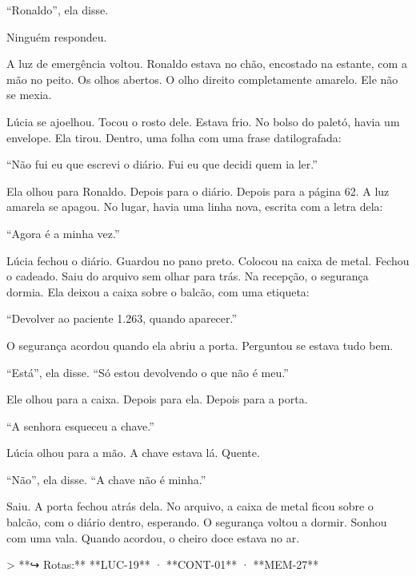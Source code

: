 \noindent ``Ronaldo'', ela disse.

\noindent Ninguém respondeu.

\noindent A luz de emergência voltou. Ronaldo estava no chão, encostado na estante, com a mão no peito. Os olhos abertos. O olho direito completamente amarelo. Ele não se mexia.

\noindent Lúcia se ajoelhou. Tocou o rosto dele. Estava frio. No bolso do paletó, havia um envelope. Ela tirou. Dentro, uma folha com uma frase datilografada:

\noindent ``Não fui eu que escrevi o diário. Fui eu que decidi quem ia ler.''

\noindent Ela olhou para Ronaldo. Depois para o diário. Depois para a página 62. A luz amarela se apagou. No lugar, havia uma linha nova, escrita com a letra dela:

\noindent ``Agora é a minha vez.''

\noindent Lúcia fechou o diário. Guardou no pano preto. Colocou na caixa de metal. Fechou o cadeado. Saiu do arquivo sem olhar para trás. Na recepção, o segurança dormia. Ela deixou a caixa sobre o balcão, com uma etiqueta:

\noindent ``Devolver ao paciente 1.263, quando aparecer.''

\noindent O segurança acordou quando ela abriu a porta. Perguntou se estava tudo bem.

\noindent ``Está'', ela disse. ``Só estou devolvendo o que não é meu.''

\noindent Ele olhou para a caixa. Depois para ela. Depois para a porta.

\noindent ``A senhora esqueceu a chave.''

\noindent Lúcia olhou para a mão. A chave estava lá. Quente.

\noindent ``Não'', ela disse. ``A chave não é minha.''

\noindent Saiu. A porta fechou atrás dela. No arquivo, a caixa de metal ficou sobre o balcão, com o diário dentro, esperando. O segurança voltou a dormir. Sonhou com uma vala. Quando acordou, o cheiro doce estava no ar.

> **↪ Rotas:** **LUC-19** · **CONT-01** · **MEM-27**
